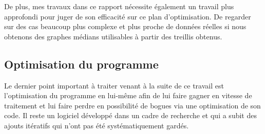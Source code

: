 De plus, mes travaux dans ce rapport nécessite également un travail plus approfondi pour juger de son efficacité sur ce plan d'optimisation. De regarder sur des cas beaucoup plus complexe et plus proche de données réelles si nous obtenons des graphes médians utilisables à partir des treillis obtenus.

\subsection{Optimisation du programme}

Le dernier point important à traiter venant à la suite de ce travail est l'optimisation du programme en lui-même afin de lui faire gagner en vitesse de traitement et lui faire perdre en possibilité de bogues via une optimisation de son code. Il reste un logiciel développé dans un cadre de recherche et qui a subit des ajouts itératifs qui n'ont pas été systématiquement gardés.